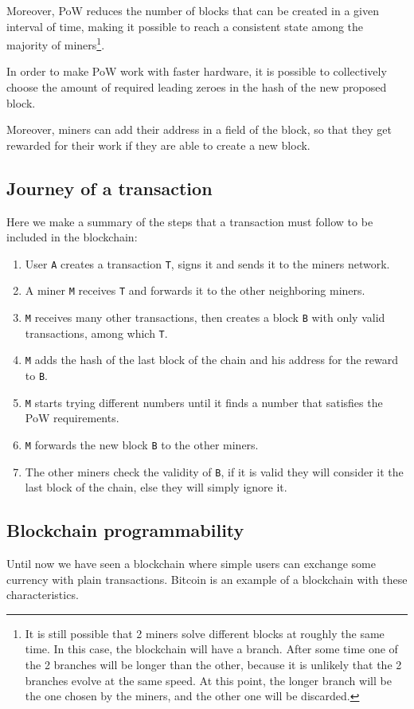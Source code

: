 \documentclass[12pt]{article}
\begin{document}
Moreover, PoW reduces the number of blocks that can be created in a given interval of time, making it possible to reach a consistent state among the majority of miners\footnote{It is still possible that 2 miners solve different blocks at roughly the same time. In this case, the blockchain will have a branch. After some time one of the 2 branches will be longer than the other, because it is unlikely that the 2 branches evolve at the same speed. At this point, the longer branch will be the one chosen by the miners, and the other one will be discarded.}.

In order to make PoW work with faster hardware, it is possible to collectively choose the amount of required leading zeroes in the hash of the new proposed block.

Moreover, miners can add their address in a field of the block, so that they get rewarded for their work if they are able to create a new block.

\subsection{Journey of a transaction} \label{subsection:joat}
Here we make a summary of the steps that a transaction must follow to be included in the blockchain:
\begin{enumerate}
    \item User \verb|A| creates a transaction \verb|T|, signs it and sends it to the miners network.
    \item A miner \verb|M| receives \verb|T| and forwards it to the other neighboring miners.
    \item \verb|M| receives many other transactions, then creates a block \verb|B| with only valid transactions, among which \verb|T|.
    \item \verb|M| adds the hash of the last block of the chain and his address for the reward to \verb|B|.
    \item \verb|M| starts trying different numbers until it finds a number that satisfies the PoW requirements.
    \item \verb|M| forwards the new block \verb|B| to the other miners. 
    \item The other miners check the validity of \verb|B|, if it is valid they will consider it the last block of the chain, else they will simply ignore it.
\end{enumerate}

\subsection{Blockchain programmability} \label{subsection:programmability}
Until now we have seen a blockchain where simple users can exchange some currency with plain transactions. Bitcoin is an example of a blockchain with these characteristics.
\end{document}

